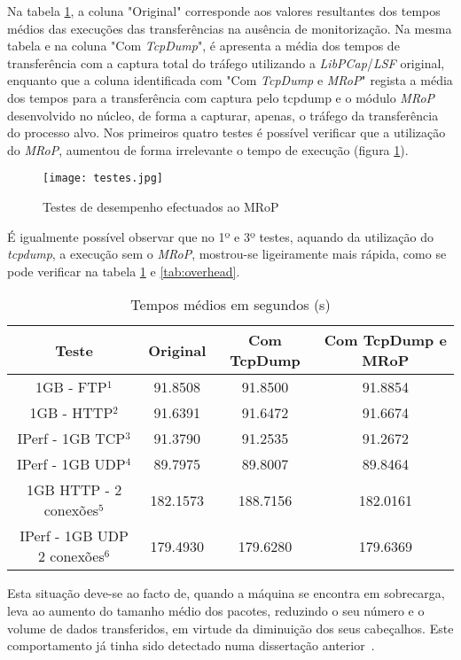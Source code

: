 Na tabela \ref{tab:desempenho}, a coluna "Original" corresponde aos valores resultantes dos tempos médios das execuções das transferências na ausência de monitorização.
Na mesma tabela e na coluna "Com \textit{TcpDump}", é apresenta a média dos tempos de transferência com a captura total do tráfego utilizando a \textit{LibPCap}/\textit{LSF} original, enquanto que a coluna identificada com "Com \textit{TcpDump} e \textit{MRoP}" regista a média dos tempos para a transferência com captura pelo tcpdump e o módulo \textit{MRoP} desenvolvido no núcleo, de forma a capturar, apenas, o tráfego da transferência do processo alvo.
Nos primeiros quatro testes é possível verificar que a utilização do \textit{MRoP}, aumentou de forma irrelevante o tempo de execução (figura \ref{fig:tests_graphics}).

\begin{figure}[!htbp]
\centering
\texttt{[image: testes.jpg]}
\caption{Testes de desempenho efectuados ao MRoP}
\label{fig:tests_graphics}
\end{figure}

É igualmente possível observar que no 1º e 3º testes, aquando da utilização do \textit{tcpdump}, a execução sem o \textit{MRoP}, mostrou-se ligeiramente mais rápida, como se pode verificar na tabela \ref{tab:desempenho} e \ref{tab:overhead}.
\begin{table}[!htb]
\begin{center}
\caption{Tempos médios em segundos (s)}
\begin{tabular}{ | c | c | c | c |  }
\hline
Teste & \hspace {0.3cm} Original \hspace {0.3cm}& \hspace {0.2cm} Com TcpDump \hspace {0.2cm} & Com TcpDump e MRoP \\
\hline
1GB - FTP$^{1}$ & 91.8508	& 91.8500 & 91.8854 \\
1GB - HTTP$^{2}$ & 91.6391 & 91.6472 & 91.6674 \\ 
IPerf - 1GB TCP$^{3}$ & 91.3790	& 91.2535	& 91.2672 \\
IPerf - 1GB UDP$^{4}$ & 89.7975 & 89.8007 & 89.8464 \\
\hline
\hline
1GB HTTP - 2 conexões$^{5}$ & 182.1573 & 188.7156 & 182.0161 \\
IPerf - 1GB UDP 2 conexões$^{6}$ & 179.4930 & 179.6280 & 179.6369 \\
\hline
\end{tabular}
\label{tab:desempenho}
\end{center}
\end{table}
Esta situação deve-se ao facto de, quando a máquina se encontra em sobrecarga, leva ao aumento do tamanho médio dos pacotes, reduzindo o seu número e o volume de dados transferidos, em virtude da diminuição dos seus cabeçalhos.
Este comportamento já tinha sido detectado numa dissertação anterior~\cite{Farruca:2009}.

